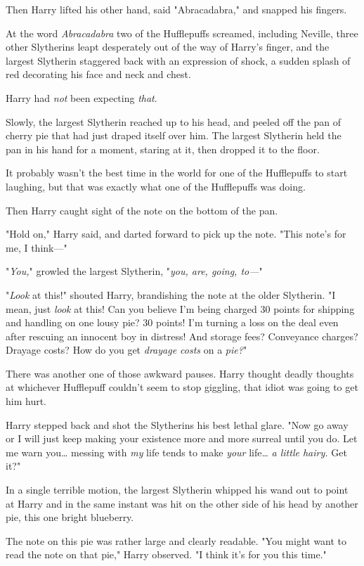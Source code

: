 Then Harry lifted his other hand, said "Abracadabra," and snapped his fingers.

At the word \emph{Abracadabra} two of the Hufflepuffs screamed, including
Neville, three other Slytherins leapt desperately out of the way of Harry's
finger, and the largest Slytherin staggered back with an expression of shock, a
sudden splash of red decorating his face and neck and chest.

Harry had \emph{not} been expecting \emph{that}.

Slowly, the largest Slytherin reached up to his head, and peeled off the pan of
cherry pie that had just draped itself over him. The largest Slytherin held the
pan in his hand for a moment, staring at it, then dropped it to the floor.

It probably wasn't the best time in the world for one of the Hufflepuffs to
start laughing, but that was exactly what one of the Hufflepuffs was doing.

Then Harry caught sight of the note on the bottom of the pan.

"Hold on," Harry said, and darted forward to pick up the note. "This note's for
me, I think---"

"\emph{You,}" growled the largest Slytherin, "\emph{you, are, going, to---}"

"\emph{Look} at this!" shouted Harry, brandishing the note at the older
Slytherin. "I mean, just \emph{look} at this! Can you believe I'm being charged
30 points for shipping and handling on one lousy pie? 30 points! I'm turning a
loss on the deal even after rescuing an innocent boy in distress! And storage
fees? Conveyance charges? Drayage costs? How do you get \emph{drayage costs} on
a \emph{pie?}"

There was another one of those awkward pauses. Harry thought deadly thoughts at
whichever Hufflepuff couldn't seem to stop giggling, that idiot was going to
get him hurt.

Harry stepped back and shot the Slytherins his best lethal glare. "Now go away
or I will just keep making your existence more and more surreal until you do.
Let me warn you{\ldots} messing with \emph{my} life tends to make \emph{your}
life{\ldots} \emph{a little hairy.} Get it?"

In a single terrible motion, the largest Slytherin whipped his wand out to
point at Harry and in the same instant was hit on the other side of his head by
another pie, this one bright blueberry.

The note on this pie was rather large and clearly readable. "You might want to
read the note on that pie," Harry observed. "I think it's for you this time."

